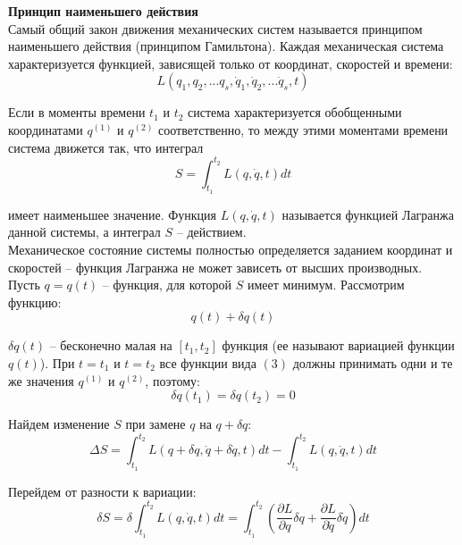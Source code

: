 \documentclass{article}
\begin{document}
	
	\textbf{Принцип наименьшего действия}\\

	Самый общий закон движения механических систем называется принципом наименьшего действия (принципом Гамильтона). Каждая механическая система характеризуется функцией, зависящей только от координат, скоростей и времени:
	\begin{equation}
		L(q_1,q_2,...q_s,\dot q_1,\dot q_2,...\dot q_s,t)
	\end{equation}

	Если в моменты времени $t_1$ и $t_2$ система характеризуется обобщенными координатами $q^{(1)}$ и $q^{(2)}$ соответственно, то между этими моментами времени система движется так, что интеграл
	\begin{equation}
		S = \int_{t_1}^{t_2} L(q,\dot q, t)dt
	\end{equation}

	имеет наименьшее значение. Функция $L(q,\dot q, t)$ называется функцией Лагранжа данной системы, а интеграл $S$ -- действием.\\

	Механическое состояние системы полностью определяется заданием координат и скоростей -- функция Лагранжа не может зависеть от высших производных.\\

	Пусть $q=q(t)$ -- функция, для которой $S$ имеет минимум. Рассмотрим функцию:
	\begin{equation}
		q(t)+\delta q(t)
	\end{equation}

	$\delta q(t)$ -- бесконечно малая на $[t_1,t_2]$ функция (ее называют вариацией функции $q(t)$). При $t=t_1$ и $t=t_2$ все функции вида $(3)$ должны принимать одни и те же значения $q^{(1)}$ и $q^{(2)}$, поэтому:
	\begin{equation}
		\delta q(t_1)=\delta q(t_2) = 0
	\end{equation}

	Найдем изменение $S$ при замене $q$ на $q+\delta q$:
	\begin{equation}
		\Delta S = \int_{t_1}^{t_2}L(q+\delta q,\dot q+\delta\dot q,t)dt - \int_{t_1}^{t_2}L(q,\dot q,t)dt
	\end{equation}

	Перейдем от разности к вариации:
	\begin{equation}
		\delta S = \delta \int_{t_1}^{t_2} L(q,\dot q,t)dt = \int_{t_1}^{t_2}(\frac{\partial L}{\partial q}\delta q + \frac{\partial L}{\partial\dot q}\delta\dot q)dt
	\end{equation}
\end{document}
